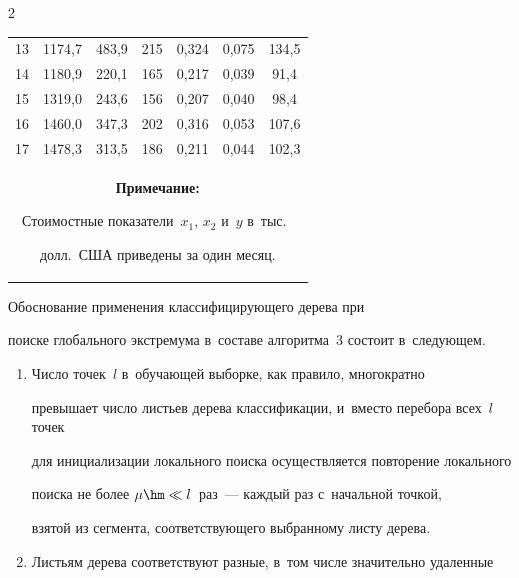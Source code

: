 \begin{multicols}{2}
\begin{table}
\begin{center}
\begin{tabular}{|c|c|c|c|c|c||c|}
13& 1174,7 &483,9& 215 &0,324 & 0,075 & 134,5 \\


14& 1180,9 &220,1& 165 &0,217 & 0,039 & \hphantom{1}91,4 \\


15& 1319,0 &243,6& 156 &0,207 & 0,040 & \hphantom{1}98,4 \\


16& 1460,0 &347,3& 202 &0,316 & 0,053 & 107,6 \\


17& 1478,3 &313,5& 186 &0,211 & 0,044 & 102,3 \\


\hline


\multicolumn{7}{p{100mm}}{\footnotesize \hspace*{2mm}\textbf{Примечание:} 


Стоимостные показатели~$x_1$, $x_2$ и~$y$ в~тыс.\


 долл.\ США приведены за один месяц.}


\end{tabular}


\end{center}


\end{table}





Обоснование применения классифицирующего дерева при 


поиске глобального экстремума в~составе алгоритма~3 состоит в~следующем.


\begin{enumerate}[1.]


\item  Число точек~$l$ в~обучающей выборке, как правило, многократно 


превышает число листьев дерева классификации, и~вместо перебора всех~$l$ точек 


для инициализации локального поиска осуществляется повторение локального 


поиска не более $\mu\hm \ll l$~раз~--- каждый раз с~начальной точкой, 


взятой из сегмента, соответствующего выбранному листу дерева.





\item 


Листьям дерева соответствуют разные, в~том числе значительно удаленные 



\end{enumerate}
\end{multicols}

